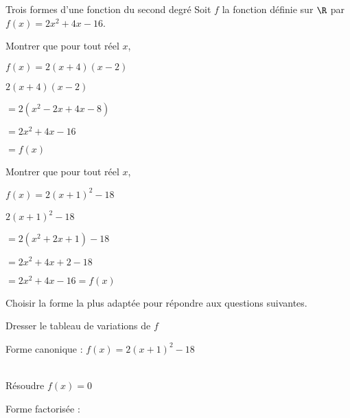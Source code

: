 \begin{EXO}{Trois formes d'une fonction du second degré}{}
Soit $f$ la fonction définie sur $\R$ par $ f(x) = 2x^2+4x-16$.
\begin{tcbenumerate}[2]
\tcbitem {} Montrer que pour tout réel $x$, 
\vspace{-0.3cm}\begin{center}$f(x) = 2(x+4)(x-2)$\end{center}
\begin{crep}
$2(x+4)(x-2) $

$= 2(x^2-2x+4x-8 ) $

$= 2x^2+ 4x -16 $

$= f(x)$

\end{crep}

\tcbitem {} Montrer que pour tout réel $x$, 
\vspace{-0.3cm}\begin{center}$f(x) = 2(x+1)^2-18$\end{center}
\begin{crep}
$2(x+1)^2-18 $

$= 2(x^2+2x+1)-18 $

$= 2x^2+4x+2-18 $

$= 2x^2+4x-16= f(x)$ 
\end{crep}
\end{tcbenumerate}
\begin{tcbenumerate}[2][3]
\tcbitem[colframe=black,boxrule=0.4pt,raster multicolumn=2] Choisir la forme la plus adaptée pour répondre aux questions suivantes.
\begin{tcbenumerate}[2][1][alph]
\tcbitem {} Dresser le tableau de variations de $f$
\begin{crep}[colback=white,colframe=white]%
Forme canonique : $f(x) = 2(x+1)^2-18$\\\\

\end{crep}

\tcbitem {} Résoudre $f(x)=0$

\begin{crep}
Forme factorisée : 


\end{crep}
\end{tcbenumerate}
\end{tcbenumerate}
\end{EXO}
